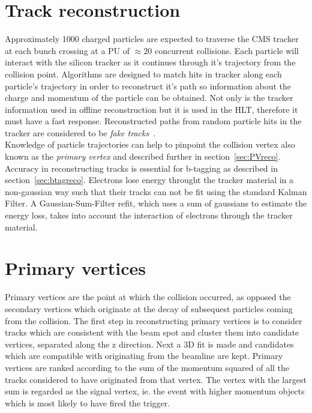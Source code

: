 \section{Track reconstruction}

Approximately 1000 charged particles are expected to traverse the CMS tracker at each bunch crossing at a PU of $\approx 20$ concurrent collisions. Each particle will interact with the silicon tracker as it continues through it's trajectory from the collision point. Algorithms are designed to match hits in tracker along each particle's trajectory in order to reconstruct it's path so information about the charge and momentum of the particle can be obtained. Not only is the tracker information used in offline reconstruction but it is used in the HLT, therefore it must have a fast response. Reconstructed paths from random particle hits in the tracker are considered to be \emph{fake tracks}~\cite{1748-0221-9-10-P10009}.\\
Knowledge of particle trajectories can help to pinpoint the collision vertex also known as the \emph{primary vertex} and described further in section~\ref{sec:PVreco}. Accuracy in reconstructing tracks is essential for b-tagging as described in section~\ref{sec:btagreco}.
Electrons lose energy throught the tracker material in a non-gaussian way such that their tracks can not be fit using the standard Kalman Filter. A Gaussian-Sum-Filter refit, which uses a sum of gaussians to estimate the energy loss, takes into account the interaction of electrons through the tracker material.


\section{Primary vertices \label{sec:PVreco}}

Primary vertices are the point at which the collision occurred, as opposed the secondary vertices which originate at the decay of subsequest particles coming from the collision. The first step in reconstructing primary vertices is to consider tracks which are consistent with the beam spot and cluster them into candidate vertices, separated along the z direction. Next a 3D fit is made and candidates which are compatible with originating from the beamline are kept. Primary vertices are ranked according to the sum of the momentum squared of all the tracks considered to have originated from that vertex. The vertex with the largest sum is regarded as the signal vertex, ie. the event with higher momentum objects which is most likely to have fired the trigger. 

